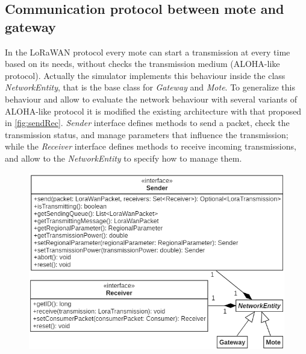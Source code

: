 \subsection{Communication protocol between mote and gateway}
In the LoRaWAN protocol every mote can start a transmission at every time based on its needs, without checks the transmission medium (ALOHA-like protocol).
Actually the simulator implements this behaviour inside the class \mbox{\textit{NetworkEntity}}, that is the base class for \mbox{\textit{Gateway}} and \mbox{\textit{Mote}}. 
To generalize this behaviour and allow to evaluate the network behaviour with several variants of ALOHA-like protocol it is modified the existing architecture with that proposed in \autoref{fig:sendRec}.
\mbox{\textit{Sender}} interface defines methods to send a packet, check the transmission status, and manage parameters that influence the transmission; while the \mbox{\textit{Receiver}} interface defines methods to receive incoming transmissions, and allow to the \mbox{\textit{NetworkEntity}} to specify how to manage them.
\begin{figure}[h]
    \centering
    \includegraphics{figures/sendRec.png}
    \caption{}
    \label{fig:sendRec}
\end{figure}

